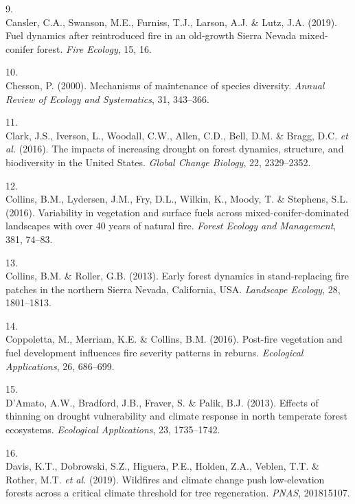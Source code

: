\documentclass[]{article}
\begin{document}
\leavevmode\hypertarget{ref-cansler2019}{}%
9.\\
Cansler, C.A., Swanson, M.E., Furniss, T.J., Larson, A.J. \& Lutz, J.A.
(2019). Fuel dynamics after reintroduced fire in an old-growth Sierra
Nevada mixed-conifer forest. \emph{Fire Ecology}, 15, 16.

\leavevmode\hypertarget{ref-chesson2000}{}%
10.\\
Chesson, P. (2000). Mechanisms of maintenance of species diversity.
\emph{Annual Review of Ecology and Systematics}, 31, 343--366.

\leavevmode\hypertarget{ref-clark2016}{}%
11.\\
Clark, J.S., Iverson, L., Woodall, C.W., Allen, C.D., Bell, D.M. \&
Bragg, D.C. \emph{et al.} (2016). The impacts of increasing drought on
forest dynamics, structure, and biodiversity in the United States.
\emph{Global Change Biology}, 22, 2329--2352.

\leavevmode\hypertarget{ref-collins2016}{}%
12.\\
Collins, B.M., Lydersen, J.M., Fry, D.L., Wilkin, K., Moody, T. \&
Stephens, S.L. (2016). Variability in vegetation and surface fuels
across mixed-conifer-dominated landscapes with over 40 years of natural
fire. \emph{Forest Ecology and Management}, 381, 74--83.

\leavevmode\hypertarget{ref-collins2013}{}%
13.\\
Collins, B.M. \& Roller, G.B. (2013). Early forest dynamics in
stand-replacing fire patches in the northern Sierra Nevada, California,
USA. \emph{Landscape Ecology}, 28, 1801--1813.

\leavevmode\hypertarget{ref-coppoletta2016}{}%
14.\\
Coppoletta, M., Merriam, K.E. \& Collins, B.M. (2016). Post-fire
vegetation and fuel development influences fire severity patterns in
reburns. \emph{Ecological Applications}, 26, 686--699.

\leavevmode\hypertarget{ref-damato2013}{}%
15.\\
D'Amato, A.W., Bradford, J.B., Fraver, S. \& Palik, B.J. (2013). Effects
of thinning on drought vulnerability and climate response in north
temperate forest ecosystems. \emph{Ecological Applications}, 23,
1735--1742.

\leavevmode\hypertarget{ref-davis2019a}{}%
16.\\
Davis, K.T., Dobrowski, S.Z., Higuera, P.E., Holden, Z.A., Veblen, T.T.
\& Rother, M.T. \emph{et al.} (2019). Wildfires and climate change push
low-elevation forests across a critical climate threshold for tree
regeneration. \emph{PNAS}, 201815107.
\end{document}

